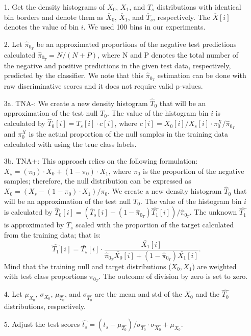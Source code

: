 \documentclass{article}
\newcommand{\edit}[1]{{\color{red}#1}}
\begin{document}
\begin{enumerate}%
	\itemsep-3pt  		
	\item [1.] Get the density histograms of $X_0$, $X_1$, and $T_s$ distributions with identical bin borders and denote them as $\overline{X}_0$, $\overline{X}_1$, and $\overline{T}_s$, respectively. The $\overline{X}[i]$ denotes the value of bin $i$.  We used 100 bins in our experiments.
	
	\item [2.] Let $\hat{\pi}_{0_T}$ be an approximated proportions of the negative test predictions calculated \edit{ $\hat{\pi}_{0_T} = N/(N+P)$, where N and P denotes the total number of the negative and positive predictions in the given test data, respectively, predicted by the classifier. We note that this $\hat{\pi}_{0_T}$ estimation can be done with raw discriminative scores and it does not require valid p-values.}
	
	\item [3a.] TNA-:  We create a new density histogram $\hat{T}_0$ that will be an approximation of the test null $T_0$. The value of the histogram bin $i$ is calculated  by $\hat{T}_0[i] = \overline{T}_s[i]\cdot c[i]$, where \edit{ $c[i]=X_0[i]/X_s[i]\cdot \pi^{X}_{0}/\hat{\pi}_{0_T}$ and $\pi^{X}_{0}$ is the actual proportion of the null samples in the training data calculated with using the true class labels.}
	
	\item [3b.] TNA+: This approach relies on the following formulation: $X_s = (\pi_0) \cdot X_0 + (1-\pi_0) \cdot X_1$, where $\pi_0$ is the proportion of the negative samples; therefore, the null distribution can be expressed as $X_0 = (X_s - (1-\pi_0) \cdot X_1)/\pi_0$. We create a new density histogram $\hat{T}_0$ that will be an approximation of the test null $T_0$. The value of the histogram bin $i$ is calculated  by $\hat{T}_0[i] = (\overline{T}_s[i] -  (1-\hat{\pi}_{0_T})\hat{T_1}[i])/\hat{\pi}_{0_T}$. The unknown $\hat{T_1}$ is approximated by $T_s$ scaled with the proportion of the target calculated from the training data; that is:  $$\hat{T_1}[i] = \overline{T_s}[i]\cdot \frac {\overline{X_1}[i]}{\hat{\pi}_{0_T} \overline{X_0}[i] + (1-\hat{\pi}_{0_T}) \overline{X_1}[i]}.$$ Mind that the training null and target distributions ($X_0, X_1$) are weighted with test class proportions  $\hat{\pi}_{0_T}$. The outcome of division by zero is set to zero.
		
	\item [4.] Let $\mu_{X_0}$, $\sigma_{X_0}$, $\mu_{\hat{T_0}}$, and $\sigma_{\hat{T_0}}$ are the mean and std of the $X_0$ and the $\hat{T_0}$ distributions, respectively. 
	
	\item [5.] Adjust the test scores $\hat{t_s} = (t_s-\mu_{\hat{T_0}})/\sigma_{\hat{T_0}} \cdot \sigma_{\hat{X_0}} + \mu_{X_0}$.
\end{enumerate}
\end{document}
